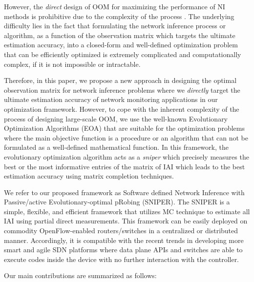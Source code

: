 However, the \emph{direct} design of OOM for
maximizing the performance of NI methods is prohibitive due to the
complexity of the process \cite{IF14iSTAMP:2014}\cite{Elad:2007}. The
underlying difficulty lies in the fact that formulating the network
inference process or algorithm, as a function of the observation
matrix which targets the ultimate estimation accuracy, into a
closed-form and well-defined optimization problem that can be
efficiently optimized is extremely complicated and computationally
complex, if it is not impossible or intractable. 

Therefore, in this
paper, we propose a new approach in designing the optimal observation
matrix for network inference problems where we \emph{directly} target
the ultimate estimation accuracy of network monitoring applications in
our optimization framework. However, to cope with the inherent
complexity of the process of designing large-scale OOM, we use the well-known Evolutionary Optimization Algorithms
(EOA) that are suitable for the optimization problems where the main
objective function is a procedure or an algorithm that can not be
formulated as a well-defined mathematical function. In this framework,
the evolutionary optimization algorithm acts as a \emph{sniper} which
precisely measures the best or the most informative
entries of the matrix of IAI which leads to the best estimation
accuracy using matrix completion techniques. 

We refer to our proposed framework as Software defined Network Inference with Passive/active Evolutionary-optimal pRobing (SNIPER). The SNIPER is a simple, flexible, and efficient framework that utilizes MC technique to estimate all IAI using partial direct measurements. This framework can be easily deployed on commodity OpenFlow-enabled routers/switches in a centralized or distributed manner. Accordingly, it is
compatible with the recent trends in developing more smart and agile
SDN platforms \cite{Bianchi:2014}\cite{Moshref:2014} where data plane
APIs and switches are able to execute codes inside the device with no
further interaction with the controller. 

Our main contributions are summarized as follows:

